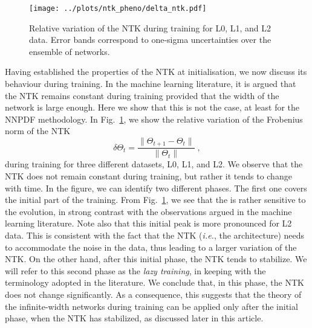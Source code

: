 \begin{figure}[h!]
  \centering
  \texttt{[image: ../plots/ntk\_pheno/delta\_ntk.pdf]}
  \caption{Relative variation of the NTK during training for L0, L1, and L2
  data. Error bands correspond to one-sigma uncertainties over the ensemble of
  networks.}
  \label{fig:NTKTime}
\end{figure}
Having established the properties of the NTK at initialisation, we now discuss
its behaviour during training. In the machine learning literature, it is argued
that the NTK remains constant during training provided that the width of the
network is large enough. Here we show that this is not the case, at least for
the NNPDF methodology. In Fig.~\ref{fig:NTKTime}, we show the relative variation
of the Frobenius norm of the NTK
\begin{equation}
\delta \Theta_t = \frac{\lVert \Theta_{t+1} - \Theta_t \rVert}{\lVert \Theta_t \rVert} \;,
\label{eq:DeltaNTK}
\end{equation}
during training for three different datasets, L0, L1, and L2. We observe that
the NTK does not remain constant during training, but rather it tends to change
with time. In the figure, we can identify two different phases. The first one
covers the initial part of the training. From Fig.~\ref{fig:NTKTime}, we see
that the is rather sensitive to the evolution, in strong contrast with the
observations argued in the machine learning literature. Note also that this
initial peak is more pronounced for L2 data. This is consistent with the fact
that the NTK (\textit{i.e.}, the architecture) needs to accommodate the noise in
the data, thus leading to a larger variation of the NTK. On the other hand,
after this initial phase, the NTK tends to stabilize. We will refer to this
second phase as the \textit{lazy training}, in keeping with the terminology
adopted in the literature. We conclude that, in this phase, the NTK does not
change significantly. As a consequence, this suggests that the theory of the
infinite-width networks during training can be applied only after the initial
phase, when the NTK has stabilized, as discussed later in this article.

